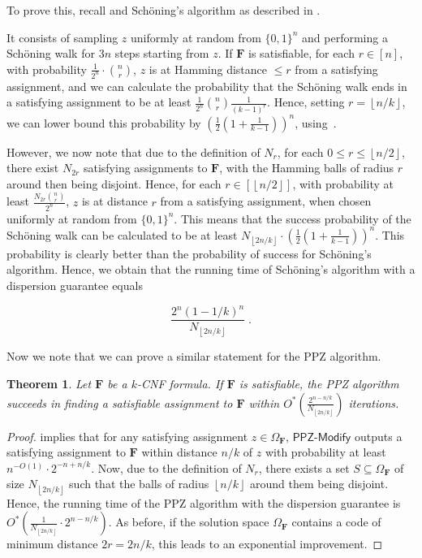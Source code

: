 \documentclass[11pt, letterpaper]{article}
\newtheorem{theorem}{Theorem}
\theoremstyle{definition}
\newcommand{\f}{\mathbf{F}}
\newcommand{\Om}{\Omega_{\f}}
\newcommand{\PPZMod}{\textsf{PPZ-Modify}}
\newcommand{\sch}{Sch\"{o}ning\xspace}
\newcommand{\floor}[1]{{\left\lfloor{#1}\right\rfloor}}
\begin{document}
\medskip \noindent
 

To prove this, recall  and \sch's algorithm as described in . 
\obssch*

\noindent
It consists of sampling $z$ uniformly at random from $\{0,1\}^n$ and performing a \sch walk for $3n$ steps starting from $z$. If $\f$ is satisfiable, for each $r \in [n]$, with probability $\frac{1}{2^n} \cdot \binom{n}{r}$, $z$ is at Hamming distance $\leq r$ from a satisfying assignment, and we can calculate the probability that the \sch walk ends in a satisfying assignment to be at least $\frac{1}{2^n} \binom{n}{r}\frac{1}{(k-1)^r}$. Hence, setting $r=\floor{n/k}$, we can lower bound this probability by $\left(\frac{1}{2}\left(1+\frac{1}{k-1}\right)\right)^n$, using~.  

\medskip \noindent
However, we now note that due to the definition of $N_r$, for each $0 \leq r \leq \floor{n/2}$, there exist $N_{2r}$ satisfying assignments to $\f$, with the Hamming balls of radius $r$ around then being disjoint. Hence, for each $r \in [\floor{n/2}]$, with probability at least $\frac{N_{2r}\binom{n}{r}}{2^n}$, $z$ is at distance $r$ from a satisfying assignment, when chosen uniformly at random from $\{0,1\}^n$. This means that the success probability of the \sch walk can be calculated to be at least $N_{\floor{2n/k}} \cdot \left(\frac{1}{2}\left(1+\frac{1}{k-1}\right)\right)^n$. This probability is clearly better than the probability of success for \sch's algorithm. Hence, we obtain that the running time of \sch's algorithm with a dispersion guarantee equals 

\[  \frac{2^n \left(1-1/k\right)^n}{N_{\floor{2n/k}}} \;.\]
 

Now we note that we can prove a similar statement for the PPZ algorithm. 
 
\begin{theorem}
    \label{thm:PPZfaster}
    Let $\f$ be a $k$-CNF formula. If $\f$ is satisfiable, the PPZ algorithm succeeds in finding a satisfiable assignment to $\f$ within $O^*\left(  \frac{ 2^{n-n/k}}{N_{\floor{2n/k}}}\right)$ iterations.
\end{theorem} 
\begin{proof}
  implies that for any satisfying assignment $z \in \Om$, $\PPZMod$ outputs a satisfying assignment to $\f$ within distance $n/k$ of $z$ with probability at least $n^{-O(1)} \cdot 2^{-n+n/k}$. Now, due to the definition of $N_r$, there exists a set $S \subseteq \Om$ of size $N_{\floor{2n/k}}$ such that the balls of radius $\floor{n/k}$ around them being disjoint. Hence, the running time of the PPZ algorithm with the dispersion guarantee is $O^*\left(\frac{1}{N_{\floor{2n/k}}} \cdot 2^{n-n/k}\right)$. As before, if the solution space $\Om$ contains a code of minimum distance $2r=2n/k$, this leads to an exponential improvement. 
 \end{proof}
 
\end{document}
